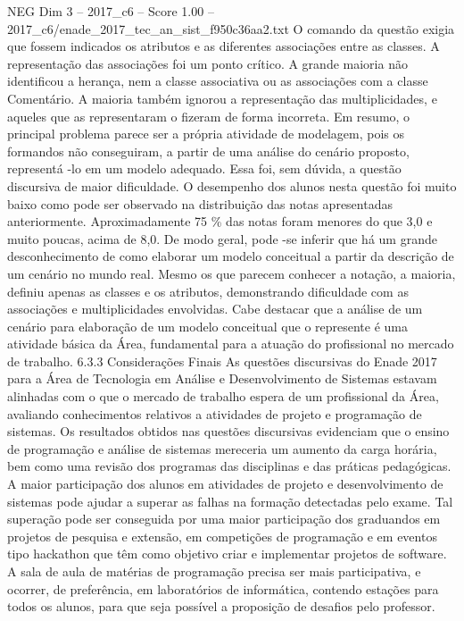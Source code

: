 \begin{textsample}{NEG Dim 3 – 2017\_c6 – Score 1.00 – 2017\_c6/enade\_2017\_tec\_an\_sist\_f950c36aa2.txt}
O comando da questão exigia que fossem indicados os atributos e as diferentes associações entre as classes.
A representação das associações foi um ponto crítico.
A grande maioria não identificou a herança, nem a classe associativa ou as associações com a classe Comentário.
A maioria também ignorou a representação das multiplicidades, e aqueles que as representaram o fizeram de forma incorreta.
Em resumo, o principal problema parece ser a própria atividade de modelagem, pois os formandos não conseguiram, a partir de uma análise do cenário proposto, representá -lo em um modelo adequado.
Essa foi, sem dúvida, a questão discursiva de maior dificuldade.
O desempenho dos alunos nesta questão foi muito baixo como pode ser observado na distribuição das notas apresentadas anteriormente.
Aproximadamente 75 \% das notas foram menores do que 3,0 e muito poucas, acima de 8,0.
De modo geral, pode -se inferir que há um grande desconhecimento de como elaborar um modelo conceitual a partir da descrição de um cenário no mundo real.
Mesmo os que parecem conhecer a notação, a maioria, definiu apenas as classes e os atributos, demonstrando dificuldade com as associações e multiplicidades envolvidas.
Cabe destacar que a análise de um cenário para elaboração de um modelo conceitual que o represente é uma atividade básica da Área, fundamental para a atuação do profissional no mercado de trabalho. 6.3.3 Considerações Finais As questões discursivas do Enade 2017 para a Área de Tecnologia em Análise e Desenvolvimento de Sistemas estavam alinhadas com o que o mercado de trabalho espera de um profissional da Área, avaliando conhecimentos relativos a atividades de projeto e programação de sistemas.
Os resultados obtidos nas questões discursivas evidenciam que o ensino de programação e análise de sistemas mereceria um aumento da carga horária, bem como uma revisão dos programas das disciplinas e das práticas pedagógicas.
A maior participação dos alunos em atividades de projeto e desenvolvimento de sistemas pode ajudar a superar as falhas na formação detectadas pelo exame.
Tal superação pode ser conseguida por uma maior participação dos graduandos em projetos de pesquisa e extensão, em competições de programação e em eventos tipo hackathon que têm como objetivo criar e implementar projetos de software.
A sala de aula de matérias de programação precisa ser mais participativa, e ocorrer, de preferência, em laboratórios de informática, contendo estações para todos os alunos, para que seja possível a proposição de desafios pelo professor.

\end{textsample}
